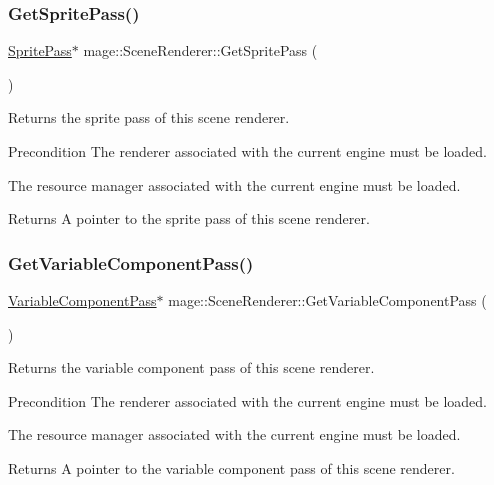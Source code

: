 \subsubsection{\texorpdfstring{Get\+Sprite\+Pass()}{GetSpritePass()}}
{\footnotesize\ttfamily \hyperlink{classmage_1_1_sprite_pass}{Sprite\+Pass}$\ast$ mage\+::\+Scene\+Renderer\+::\+Get\+Sprite\+Pass (\begin{DoxyParamCaption}{ }\end{DoxyParamCaption})}

Returns the sprite pass of this scene renderer.

\begin{DoxyPrecond}{Precondition}
The renderer associated with the current engine must be loaded. 

The resource manager associated with the current engine must be loaded. 
\end{DoxyPrecond}
\begin{DoxyReturn}{Returns}
A pointer to the sprite pass of this scene renderer. 
\end{DoxyReturn}
\hypertarget{classmage_1_1_scene_renderer_a9537cbf602aa7bfa5f197812683bfb37}{}\label{classmage_1_1_scene_renderer_a9537cbf602aa7bfa5f197812683bfb37} 
\subsubsection{\texorpdfstring{Get\+Variable\+Component\+Pass()}{GetVariableComponentPass()}}
{\footnotesize\ttfamily \hyperlink{classmage_1_1_variable_component_pass}{Variable\+Component\+Pass}$\ast$ mage\+::\+Scene\+Renderer\+::\+Get\+Variable\+Component\+Pass (\begin{DoxyParamCaption}{ }\end{DoxyParamCaption})}

Returns the variable component pass of this scene renderer.

\begin{DoxyPrecond}{Precondition}
The renderer associated with the current engine must be loaded. 

The resource manager associated with the current engine must be loaded. 
\end{DoxyPrecond}
\begin{DoxyReturn}{Returns}
A pointer to the variable component pass of this scene renderer. 
\end{DoxyReturn}
\hypertarget{classmage_1_1_scene_renderer_a1eb6332a375e6f8273c26223c832d22c}{}\label{classmage_1_1_scene_renderer_a1eb6332a375e6f8273c26223c832d22c} 
